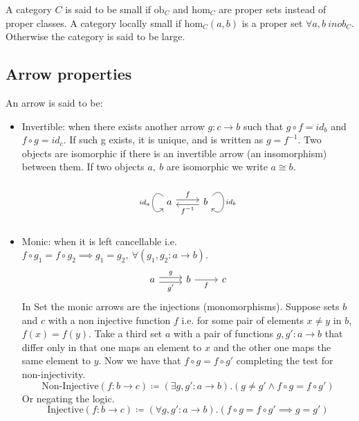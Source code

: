 \noindent A category $C$ is said to be small if $\mathrm{ob}_C$ and
$\mathrm{hom}_C$ are proper sets instead of proper classes. A category locally
small if $\mathrm{hom}_C(a, b)$ is a proper set $\forall a, b\ in ob_C$.
Otherwise the category is said to be large. \cite{nlab:category}
\medskip

\subsection{Arrow properties}
An arrow is said to be: \cite{categories_working_mathematician}
\begin{itemize}
  \item Invertible: when there exists another arrow $g:c \to b$ such that
    $g\circ f = id_b$ and $f\circ g = id_c$. If such g exists, it is unique, and
    is written as $g= f^{-1}$. Two objects are isomorphic if there is an
    invertible arrow (an insomorphism) between them. If two objects $a,\ b$
    are isomorphic we write $a\cong b$.
    \[\begin{tikzcd}
      a & b
      \arrow["f", shift left=1, from=1-1, to=1-2]
      \arrow["{f^{-1}}", shift left=1, from=1-2, to=1-1]
      \arrow["id_a"', out=90+45, in=-90-45, looseness=4.5, from=1-1, to=1-1]
      \arrow["id_b", out=45, in=-45, looseness=4.5, from=1-2, to=1-2]
    \end{tikzcd}\]
  \item Monic: when it is left cancellable i.e.
    $f \circ g_1 = f \circ g_2 \implies g_1 = g_2,\ \forall (g_1, g_2:a\to b)$.
    \[\begin{tikzcd}
      a & b & c
      \arrow["g", shift left=1, from=1-1, to=1-2]
      \arrow["{g'}"', shift right=1, from=1-1, to=1-2]
      \arrow["f"', from=1-2, to=1-3]
    \end{tikzcd}\]
    In Set the monic arrows are the injections (monomorphisms).
    Suppose sets $b$ and $c$ with a non injective function $f$ i.e. for some
    pair of elements $x \neq y$ in $b$, $f(x) = f(y)$. Take a third set $a$ with
    a pair of functions $g, g':a\to b$ that differ only in that one maps an
    element to $x$ and the other one maps the same element to $y$. Now we have
    that $f\circ g = f\circ g'$ completing the test for non-injectivity.
    \[\text{Non-Injective}(f:b\to c)
      \coloneq(\exists g, g':a\to b).(g \neq g' \land f\circ g = f\circ g')\]
    Or negating the logic.
    \[\text{Injective}(f:b\to c)
      \coloneq(\forall g, g':a\to b).(f\circ g = f\circ g' \implies g=g')\]


\end{itemize}
